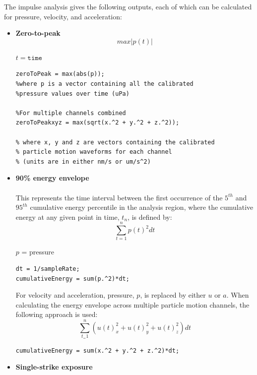 \documentclass[11pt]{report}
\begin{document}
The impulse analysis gives the following outputs, each of which can be calculated for pressure, velocity, and acceleration:\\
\begin{itemize}
\item \textbf{Zero-to-peak}
$$\mathit{max}|\mathit{p(t)}|$$
\begin{flushright}
$t = \mathtt{time}$
\end{flushright}

\begin{lstlisting}
zeroToPeak = max(abs(p));
%where p is a vector containing all the calibrated
%pressure values over time (uPa)

%For multiple channels combined
zeroToPeakxyz = max(sqrt(x.^2 + y.^2 + z.^2));

% where x, y and z are vectors containing the calibrated
% particle motion waveforms for each channel
% (units are in either nm/s or um/s^2)

\end{lstlisting}


\item \textbf{90\% energy envelope}\\\\
This represents the time interval between the first occurrence of the $5^{th}$ and $95^{th}$ cumulative energy percentile in the analysis region, where the cumulative energy at any given point in time, $t_n$, is defined by:\\
$$\sum_{t = 1}^{n}p(t)^2 dt$$
\begin{flushright}
$p$ = pressure
\end{flushright}

\begin{lstlisting}
dt = 1/sampleRate;
cumulativeEnergy = sum(p.^2)*dt;
\end{lstlisting}


For velocity and acceleration, pressure, $p$, is replaced by either $u$ or $a$.  When calculating the energy envelope across multiple particle motion channels, the following approach is used:\\

$$\sum_{t_ = 1}^{n} \left( u(t)_x^2 + u(t)_y^2 + u(t)_z^2 \right) dt$$

\begin{lstlisting}
cumulativeEnergy = sum(x.^2 + y.^2 + z.^2)*dt;
\end{lstlisting}

\item \textbf{Single-strike exposure}


\end{itemize}
\end{document}
